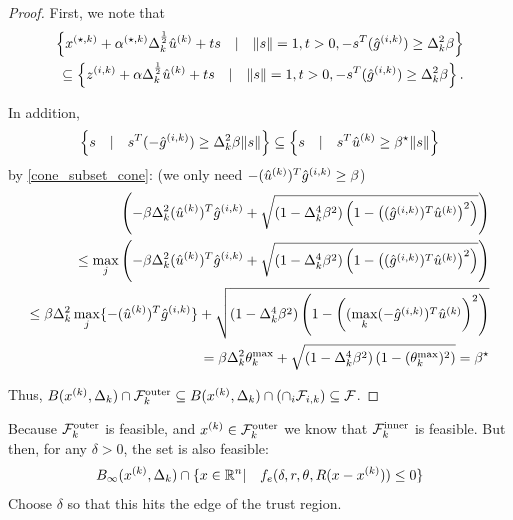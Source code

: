 \begin{proof}
First, we note that
\begin{align*}
\left \{{x^{(\star, k)}} + {\alpha^{(\star, k)}}\Delta_k^{\frac 1 2}{{\hat u}^{(k)}}  + t s\quad | \quad \|s\| = 1, t> 0, -s^T({{\hat g}^{(i, k)}})\ge\Delta_k^2\beta \right\} \\
\subseteq \left \{{z^{(i, k)}} + \alpha\Delta_k^{\frac 1 2}{{\hat u}^{(k)}} + t s\quad | \quad \|s\| = 1, t> 0, -s^T({{\hat g}^{(i, k)}})\ge\Delta_k^2\beta \right\}.  \\
\end{align*}

In addition,
\begin{align*}
\left\{s\quad | \quad s^T(-{{\hat g}^{(i, k)}})\ge\Delta_k^2\beta\|s\| \right\}  \subseteq \left\{s\quad | \quad s^T{{\hat u}^{(k)}}\ge\beta^{\star}\|s\| \right\}
\end{align*}
by \cref{cone_subset_cone}: (\color{red}we only need $-({{\hat u}^{(k)}})^T{{\hat g}^{(i, k)}} \ge \beta$\color{black})
\begin{align*}
\left(-\beta\Delta_k^2({{\hat u}^{(k)}})^T{{\hat g}^{(i, k)}} + \sqrt{(1 - \Delta_k^4\beta^2)\left(1 - \left(({{\hat g}^{(i, k)}})^T\hat u^{(k)}\right)^2\right)}\right) \\
\le \max_j \left(-\beta\Delta_k^2({{\hat u}^{(k)}})^T{{{\hat g}^{(i, k)}}} + \sqrt{(1 - \Delta_k^4\beta^2)\left(1 - \left(({{\hat g}^{(i, k)}})^T{{\hat u}^{(k)}}\right)^2\right)}\right) \\
\le \beta\Delta_k^2 \max_j\{-({{\hat u}^{(k)}})^T{{\hat g}^{(i, k)}}\} + \sqrt{(1 - \Delta_k^4\beta^2)\left(1 - \left((\max_k(-{{\hat g}^{(i, k)}})^T{{\hat u}^{(k)}}\right)^2\right)} \\
= \beta\Delta_k^2 \theta^{\text{max}}_k + \sqrt{(1 - \Delta_k^4\beta^2)\left(1 - (\theta^{\text{max}}_k) ^2\right)} = \beta^{\star}
\end{align*}

Thus, $B({x^{(k)}}, \Delta_k) \cap {\mathcal {F}^{\text{outer}}_k} \subseteq B({x^{(k)}}, \Delta_k) \cap \left(\cap_i {\mathcal F_{i, k}} \right)\subseteq {\mathcal F}$.
\end{proof}




\color{red}

Because ${\mathcal {F}^{\text{outer}}_k}$ is feasible, and ${x^{(k)}} \in {\mathcal {F}^{\text{outer}}_k}$ we know that $ {\mathcal {F}^{\text{inner}}_k} $ is feasible.
But then, for any $\delta > 0$, the set is also feasible:
\begin{align*}
B_{\infty}({x^{(k)}}, \Delta_k) \cap \{x \in {\mathbb R^{n}} | \quad f_e(\delta, r, \theta, R(x - {x^{(k)}})) \le 0\}
\end{align*}
Choose $\delta$ so that this hits the edge of the trust region.


\color{black}


\begin{theorem}
\end{theorem}

